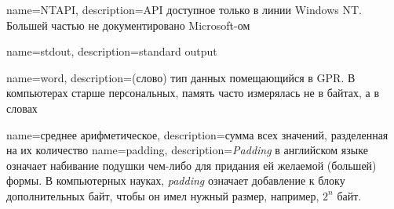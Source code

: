 {
  name=NTAPI,
  description={\ac{API} доступное только в линии Windows NT. 
  Большей частью не документировано Microsoft-ом}
}

{
  name=stdout,
  description={standard output}
}

{
  name=word,
  description={(слово) тип данных помещающийся в \ac{GPR}. 
  В компьютерах старше персональных, память часто измерялась не в байтах, 
  а в словах}
}

{
  name=среднее арифметическое,
  description={сумма всех значений, разделенная на их количество}
}
{
  name=padding,
  description={\emph{Padding} в английском языке означает набивание подушки чем-либо для придания ей желаемой (большей)
  формы. В компьютерных науках, \emph{padding} означает добавление к блоку дополнительных байт, чтобы он имел нужный
  размер, например, $2^n$ байт.}
}

